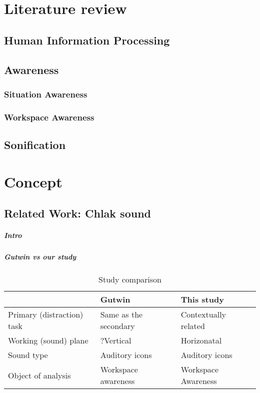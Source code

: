 \chapter{Literature review}
\section{Human Information Processing}
\section{Awareness}
\subsection{Situation Awareness}
\subsection{Workspace Awareness}
\section{Sonification}
\chapter{Concept}
\section{Related Work: Chlak sound}
\paragraph{Intro}
\paragraph{Gutwin vs our study}

\begin{table}[]
  \caption{Study comparison}
  \label{table:study_comp}
  \begin{tabular}{|l|l|l|}
  \hline
                             & Gutwin                & This study           \\ \hline
  Primary (distraction) task & Same as the secondary & Contextually related \\ \hline
  Working (sound) plane      & ?Vertical             & Horizonatal          \\ \hline
  Sound type                 & Auditory icons        & Auditory icons       \\ \hline
  Object of analysis         & Workspace awareness   & Workspace Awareness  \\ \hline
  \end{tabular}
\end{table}

